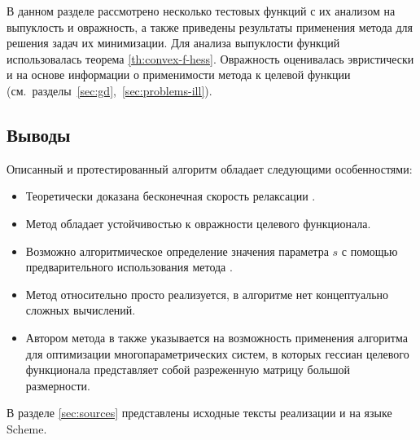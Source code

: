 В данном разделе рассмотрено несколько тестовых функций с их анализом
на выпуклость и овражность, а также приведены результаты применения
метода \relch{} для решения задач их минимизации. Для анализа
выпуклости функций использовалась теорема \ref{th:convex-f-hess}.
Овражность оценивалась эвристически и на основе информации о
применимости метода \gd{} к целевой функции
(см. разделы \ref{sec:gd}, \ref{sec:problems-ill}).




\clearpage


\clearpage


\clearpage


\subsection{Выводы}

Описанный и протестированный алгоритм \relch{} обладает следующими
особенностями:
\begin{itemize}
\item Теоретически доказана бесконечная скорость релаксации \relch{}.
\item Метод \relch{} обладает устойчивостью к овражности целевого
  функционала.
\item Возможно алгоритмическое определение значения параметра $s$ с
  помощью предварительного использования метода \gd{}.
\item Метод относительно просто реализуется, в алгоритме нет
  концептуально сложных вычислений.
\item Автором метода в \cite{chernorutsky04} также указывается на
  возможность применения алгоритма для оптимизации
  многопараметрических систем, в которых гессиан целевого функционала
  представляет собой разреженную матрицу большой размерности.
\end{itemize}

В разделе \ref{sec:sources} представлены исходные тексты реализации
\relch{} и \gdrelch{} на языке Scheme.
